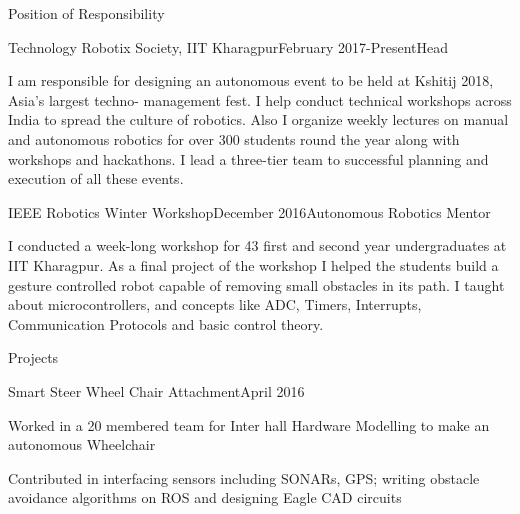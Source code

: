 \documentclass{resume} %
\begin{document}
\begin{rSection}{Position of Responsibility}

\begin{rSubsection}{Technology Robotix Society, IIT Kharagpur}{February 2017-Present}{Head}{}
\item I am responsible for designing an autonomous event to be held at Kshitij 2018, Asia’s largest techno-
management fest. I help conduct technical workshops across India to spread the culture of robotics. Also
I organize weekly lectures on manual and autonomous robotics for over 300 students round the year along with
workshops and hackathons. I lead a three-tier team to successful planning and execution of all these events.

\end{rSubsection}



\begin{rSubsection}{IEEE Robotics Winter Workshop}{December 2016}{Autonomous Robotics Mentor}{}
\item I conducted a week-long workshop for 43 first and second year undergraduates at IIT Kharagpur. As a final project of the workshop I helped the students build a gesture controlled robot capable of removing small obstacles in its path. I taught about microcontrollers, and concepts like ADC, Timers, Interrupts, Communication Protocols and basic control theory.

\end{rSubsection}


\begin{rSection}{Projects}

\begin{rSubsection}{Smart Steer Wheel Chair Attachment}{April 2016}{}{}
\item Worked in a 20 membered team for Inter hall Hardware Modelling to make an autonomous Wheelchair
\item Contributed in interfacing sensors including SONARs, GPS; writing obstacle avoidance algorithms on ROS and designing Eagle CAD circuits
\end{rSubsection}





\end{rSection}








\end{rSection}
\end{document}
